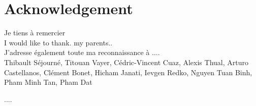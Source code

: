 \chapter*[Acknowledgement]{Acknowledgement}

\localtableofcontents*


Je tiens à remercier  \\
I would like to thank. my parents..\\
J'adresse également toute ma reconnaissance à .... \\

Thibault Séjourné, Titouan Vayer, Cédric-Vincent Cuaz,
Alexis Thual,
Arturo Castellanos,
Clément Bonet,
Hicham Janati,
Ievgen Redko,
Nguyen Tuan Binh,
Pham Minh Tan,
Pham Dat



....
